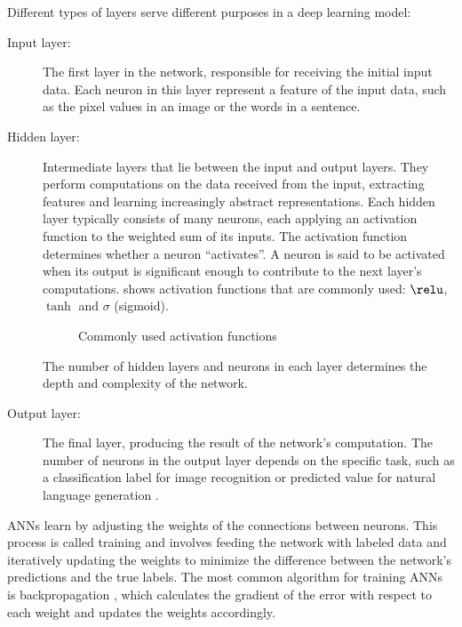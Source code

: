 Different types of layers serve different purposes in a deep learning model:
\begin{description}
    \item[Input layer:] 
    The first layer in the network, responsible for receiving the initial input data.
    Each neuron in this layer represent a feature of the input data, such as the pixel values in an image or the words in a sentence.
    \item[Hidden layer:] 
    Intermediate layers that lie between the input and output layers.
    They perform computations on the data received from the input, extracting features and learning increasingly abstract representations.
    Each hidden layer typically consists of many neurons, each applying an activation function to the weighted sum of its inputs.
    The activation function determines whether a neuron ``activates''.
    A neuron is said to be activated when its output is significant enough to contribute to the next layer's computations.
     shows activation functions that are commonly used: $\relu$, $\tanh$ and $\sigma$ (sigmoid).

    \begin{figure}[hbtp]
        \centering    
        
        \caption{Commonly used activation functions}
        \label{fig:activation_functions}
    \end{figure} 

    The number of hidden layers and neurons in each layer determines the depth and complexity of the network.
    \item[Output layer:] 
    The final layer, producing the result of the network's computation.
    The number of neurons in the output layer depends on the specific task, such as a classification label for image recognition or predicted value for natural language generation \cite{goodfellowDeepLearning2016}.
\end{description}

ANNs learn by adjusting the weights of the connections between neurons.
This process is called training and involves feeding the network with labeled data and iteratively updating the weights to minimize the difference between the network's predictions and the true labels.
The most common algorithm for training ANNs is backpropagation \cite{rumelhartLearningRepresentationsBackpropagating1986}, which calculates the gradient of the error with respect to each weight and updates the weights accordingly.

